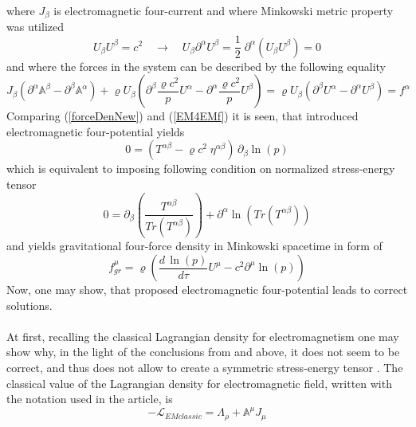 \documentclass[aps,prx,preprint,groupedaddress,showkeys]{revtex4-2}
\newcommand{\mds}[1] {\frac{d {#1}}{d\tau}}
\begin{document}
where $J_{\beta}$ is electromagnetic four-current and where Minkowski metric property was utilized
\begin{equation} \label{MPR}
U_{\beta}U^{\beta} = c^2 \quad \rightarrow \quad U_{\beta}\partial^{\alpha}U^{\beta}=\frac{1}{2}\;  \partial^{\alpha} \left ( U_{\beta}U^{\beta} \right ) = 0 
\end{equation}
and where the forces in the system can be described by the following equality
\begin{equation} \label{Equality}
J_{\beta} \left ( \partial^{\alpha}\mathbb{A}^{\beta} - \partial^{\beta}\mathbb{A}^{\alpha} \right ) + \varrho U_{\beta} \left ( \partial^{\beta} \frac{\varrho c^2}{p} U^{\alpha} - \partial^{\alpha}\frac{\varrho c^2}{p} U^{\beta} \right ) = \varrho U_{\beta} \left ( \partial^{\beta} U^{\alpha} - \partial^{\alpha} U^{\beta} \right ) = f^{\alpha}
\end{equation}
Comparing (\ref{forceDenNew}) and (\ref{EM4EMf}) it is seen, that introduced electromagnetic four-potential yields 
\begin{equation} \label{For0tens}
0 = \left ( T^{\alpha \beta} - \varrho c^2 \; \eta^{\alpha \beta} \right ) \, \partial_{\beta} \ln{(p)}
\end{equation}
which is equivalent to imposing following condition on normalized stress-energy tensor
\begin{equation} \label{normCond}
0 = \partial_{\beta} \left ( \frac{T^{\alpha \beta}}{Tr(T^{\alpha \beta})}  \right ) + \partial^{\alpha} \ln{\left ( Tr(T^{\alpha \beta}) \right )}
\end{equation}
and yields gravitational four-force density in Minkowski spacetime in form of
\begin{equation} \label{SIMGR}
f^{\mu}_{gr} = \varrho \left ( \mds{\, \ln{(p)}} U^{\mu} - c^2 \partial^{\mu} \ln{(p)} \right )
\end{equation}
Now, one may show, that proposed electromagnetic four-potential leads to correct solutions.\\
~\\
At first, recalling the classical Lagrangian density \cite{LagDen} for electromagnetism one may show why, in the light of the conclusions from \cite{PMofC} and above, it does not seem to be correct, and thus does not allow to create a symmetric stress-energy tensor \cite{MEDP}. The classical value of the Lagrangian density for electromagnetic field, written with the notation used in the article, is
\begin{equation} \label{CLASSLAG}
- \mathcal{L}_{EMclassic} = \Lambda_{\rho} + \mathbb{A}^{\mu} J_{\mu}
\end{equation}
\end{document}
